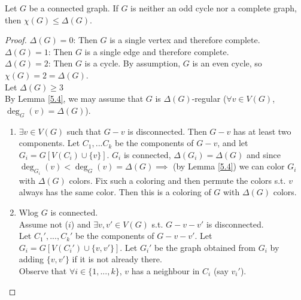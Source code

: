 \begin{theorem}\label{5.5}
    Let $G$ be a connected graph. If $G$ is neither an odd cycle nor a complete graph, then $\chi(G) \leq \Delta(G)$.
\end{theorem}
\begin{proof}
    $\Delta(G)=0$: Then $G$ is a single vertex and therefore complete.\\
    $\Delta(G)=1$: Then $G$ is a single edge and therefore complete.\\
    $\Delta(G)=2$: Then $G$ is a cycle. By assumption, $G$ is an even cycle, so
    $\chi(G)=2=\Delta(G)$.\\
    Let $\Delta(G)\geq 3$\\
    By Lemma \ref{5.4}, we may assume that $G$ is $\Delta(G)$-regular ($\forall v\in V(G)$, $\deg_G(v)=\Delta(G)$).\\
    \begin{enumerate}
        \item $\exists v\in V(G)$ such that $G-v$ is disconnected. Then $G-v$ has at least two components. Let $C_1,...C_k$ be the components of $G-v$, and let $G_i=G[V(C_i)\cup\{v\}]$. $G_i$ is connected, $\Delta(G_i)=\Delta(G)$ and since $\deg_{G_i}(v)<\deg_G(v)=\Delta(G)\implies$ (by Lemma \ref{5.4}) we can color $G_i$ with $\Delta(G)$ colors. Fix such a coloring and then permute the colors s.t. $v$ always has the same color. Then this is a coloring of $G$ with $\Delta(G)$ colors.\\
            \begin{center}
            \end{center}
        \item Wlog $G$ is connected.\\
        Assume not ($i$) and $\exists v,v'\in V(G)$ s.t. $G-v-v'$ is disconnected.\\
        Let $C_1',...,C_k'$ be the components of $G-v-v'$. Let $G_i=G[V(C_i')\cup\{v,v'\}]$. Let $G_i'$ be the graph obtained from $G_i$ by adding $\{v,v'\}$ if it is not already there.\\
        Observe that $\forall i\in\{1,...,k\}$, $v$ has a neighbour in $C_i$ (say $v_i'$).\par
              

\end{enumerate}
\end{proof}
